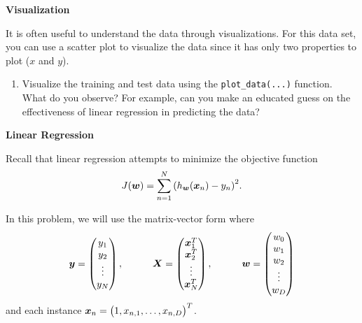 \documentclass[11pt]{article}
\begin{document}
\vspace{10pt} {\large \textbf{Visualization} }

It is often useful to understand the data through visualizations. For this data set, you can use a scatter plot to visualize the data since it has only two properties to plot ($x$ and $y$).

\begin{enumerate}

\item Visualize the training and test data using the \verb|plot_data(...)| function. What do you observe? For example, can you make an educated guess on the effectiveness of linear regression in predicting the data? 

\solution{
}

\end{enumerate}

\vspace{10pt} {\large \textbf{Linear Regression} }

Recall that linear regression attempts to minimize the objective function
\begin{equation*}
J(\boldsymbol{w}) =  \sum_{n=1}^{N}{\left(h_{\boldsymbol{w}}(\boldsymbol{x}_{n}) - y_{n}\right)^2}.
\end{equation*}

In this problem, we will use the matrix-vector form where
\begin{equation*}
\boldsymbol{y} =\begin{pmatrix}
y_{1}\\
y_{2}\\
\vdots\\
y_{N}
\end{pmatrix},
\quad \quad \quad
\boldsymbol{X} = \begin{pmatrix}
\boldsymbol{x}_{1}^T \\
\boldsymbol{x}_{2}^T  \\
\vdots  \\
\boldsymbol{x}_{N}^T  \\
\end{pmatrix},
\quad \quad \quad
\boldsymbol{w} = \begin{pmatrix}
w_0\\
w_1\\
w_2\\
\vdots\\
w_D
\end{pmatrix}
\end{equation*}
and each instance $\boldsymbol{x}_{n} = \bigl( 1, x_{n,1}, \ldots, x_{n,D} \bigr)^T$. 
\end{document}

